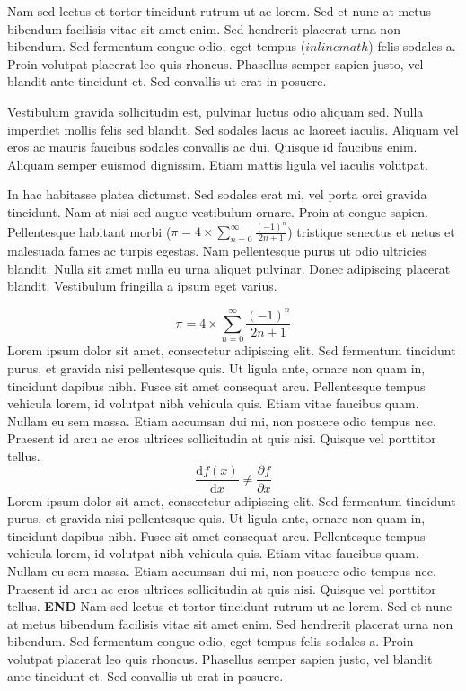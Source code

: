 \documentclass{report}
\begin{document}
Nam sed lectus et tortor tincidunt rutrum ut ac lorem. Sed et nunc at metus bibendum facilisis vitae sit amet enim. Sed hendrerit placerat urna non bibendum. Sed fermentum congue odio, eget tempus ($inline math$) felis sodales a. Proin volutpat placerat leo quis rhoncus. Phasellus semper sapien justo, vel blandit ante tincidunt et. Sed convallis ut erat in posuere.

Vestibulum gravida sollicitudin est, pulvinar luctus odio aliquam sed. Nulla imperdiet mollis felis sed blandit. Sed sodales lacus ac laoreet iaculis. Aliquam vel eros ac mauris faucibus sodales convallis ac dui. Quisque id faucibus enim. Aliquam semper euismod dignissim. Etiam mattis ligula vel iaculis volutpat.

In hac habitasse platea dictumst. Sed sodales erat mi, vel porta orci gravida tincidunt. Nam at nisi sed augue vestibulum ornare. Proin at congue sapien. Pellentesque habitant morbi ($\pi = 4 \times \sum _{n=0} ^{\infty} \frac{(-1)^n}{2n+1}$) tristique senectus et netus et malesuada fames ac turpis egestas. Nam pellentesque purus ut odio ultricies blandit. Nulla sit amet nulla eu urna aliquet pulvinar. Donec adipiscing placerat blandit. Vestibulum fringilla a ipsum eget varius.

$$\pi = 4 \times \sum _{n=0} ^{\infty} \frac{(-1)^n}{2n+1}$$
Lorem ipsum dolor sit amet, consectetur adipiscing elit. Sed fermentum tincidunt purus, et gravida nisi pellentesque quis. Ut ligula ante, ornare non quam in, tincidunt dapibus nibh. Fusce sit amet consequat arcu. Pellentesque tempus vehicula lorem, id volutpat nibh vehicula quis. Etiam vitae faucibus quam. Nullam eu sem massa. Etiam accumsan dui mi, non posuere odio tempus nec. Praesent id arcu ac eros ultrices sollicitudin at quis nisi. Quisque vel porttitor tellus.
$$\frac{\mathrm{d}f(x)}{\mathrm{d} x} \neq \frac{{\partial}f}{{\partial} x}$$
Lorem ipsum dolor sit amet, consectetur adipiscing elit. Sed fermentum tincidunt purus, et gravida nisi pellentesque quis. Ut ligula ante, ornare non quam in, tincidunt dapibus nibh. Fusce sit amet consequat arcu. Pellentesque tempus vehicula lorem, id volutpat nibh vehicula quis. Etiam vitae faucibus quam. Nullam eu sem massa. Etiam accumsan dui mi, non posuere odio tempus nec. Praesent id arcu ac eros ultrices sollicitudin at quis nisi. Quisque vel porttitor tellus. \textbf{END}
Nam sed lectus et tortor tincidunt rutrum ut ac lorem. Sed et nunc at metus bibendum facilisis vitae sit amet enim. Sed hendrerit placerat urna non bibendum. Sed fermentum congue odio, eget tempus felis sodales a. Proin volutpat placerat leo quis rhoncus. Phasellus semper sapien justo, vel blandit ante tincidunt et. Sed convallis ut erat in posuere.
\end{document}
